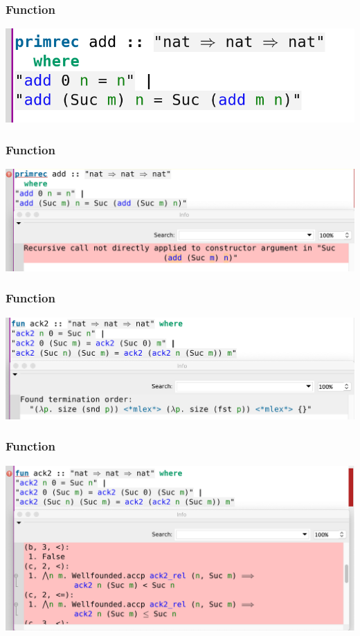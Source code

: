 \documentclass{beamer}
\begin{document}
  \begin{frame}
    \frametitle{Function }
    \centering
    \includegraphics[scale=0.4]{images/primrec_ok.png}
  \end{frame}
  \begin{frame}
    \frametitle{Function }
    \centering
    \includegraphics[scale=0.36]{images/primrec_error.png}
  \end{frame}
  \begin{frame}
    \frametitle{Function }
    \centering
    \includegraphics[scale=0.36]{images/acker_ok.png}
  \end{frame}
  \begin{frame}
    \frametitle{Function }
    \centering
    \includegraphics[scale=0.36]{images/acker_error.png}
  \end{frame}
\end{document}
